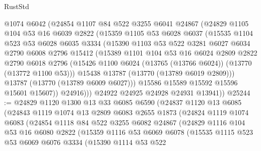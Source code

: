 \begin{lexlean}{RustStd}
\begin{coremodule}
          @1074
          @6042
          (@24854
            @1107
            @84
            @522
            @3255
            @6041
            @24867
            (@24829
              @1105
              @104
              @53
              @16
              @6039
              @2822
              (@15359
                @1105
                @53
                @6028
                @6037
                (@15535
                  @1104
                  @523
                  @53
                  @6028
                  @6035
                  @3334
                  (@15390
                    @1103
                    @53
                    @522
                    @3281
                    @6027
                    @6034
                    @2790
                    @6008
                    @2796
                    @15412
                    (@15389
                      @1101
                      @104
                      @53
                      @16
                      @6024
                      @2809
                      @2822
                      @2790
                      @6018
                      @2796
                      (@15426 @1100 @6024 (@13765 (@13766 @6024)) (@13770 (@13772 @1100 @53)))
                      @15438
                      @13787
                      (@13770 (@13789 @6019 @2809)))
                    @13787
                    (@13770 (@13789 @6009 @6027)))
                  @15586
                  @15589
                  @15592
                  @15596
                  @15601
                  @15607))
              @24916)))
        @24922
        @24925
        @24928
        @24931
        @13941))
@25244 := @24829
    @1120
    @1300
    @13
    @33
    @6085
    @6590
    (@24837
      @1120
      @13
      @6085
      (@24843
        @1119
        @1074
        @13
        @2809
        @6083
        @2655
        @1873
        (@24824
          @1119
          @1074
          @6083
          (@24854
            @1118
            @84
            @522
            @3255
            @6082
            @24867
            (@24829
              @1116
              @104
              @53
              @16
              @6080
              @2822
              (@15359
                @1116
                @53
                @6069
                @6078
                (@15535
                  @1115
                  @523
                  @53
                  @6069
                  @6076
                  @3334
                  (@15390
                    @1114
                    @53
                    @522

\end{coremodule}
\end{lexlean}
